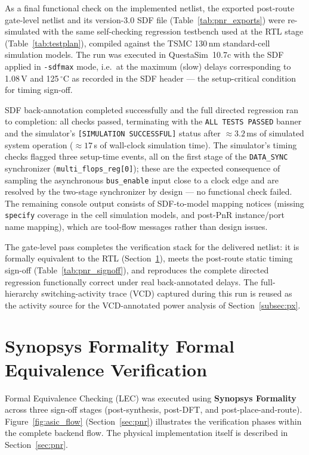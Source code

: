 \documentclass[11pt,a4paper]{article}
\begin{document}
As a final functional check on the implemented netlist, the exported post-route gate-level netlist and its version-3.0 SDF file (Table~\ref{tab:pnr_exports}) were re-simulated with the same self-checking regression testbench used at the RTL stage (Table~\ref{tab:testplan}), compiled against the TSMC 130\,nm standard-cell simulation models. The run was executed in QuestaSim~10.7c with the SDF applied in \texttt{-sdfmax} mode, i.e.\ at the maximum (slow) delays corresponding to 1.08\,V and 125\,$^\circ$C as recorded in the SDF header --- the setup-critical condition for timing sign-off.

SDF back-annotation completed successfully and the full directed regression ran to completion: all checks passed, terminating with the \texttt{ALL TESTS PASSED} banner and the simulator's \texttt{[SIMULATION SUCCESSFUL]} status after $\approx 3.2$\,ms of simulated system operation ($\approx 17$\,s of wall-clock simulation time). The simulator's timing checks flagged three setup-time events, all on the first stage of the \texttt{DATA\_SYNC} synchronizer (\texttt{multi\_flops\_reg[0]}); these are the expected consequence of sampling the asynchronous \texttt{bus\_enable} input close to a clock edge and are resolved by the two-stage synchronizer by design --- no functional check failed. The remaining console output consists of SDF-to-model mapping notices (missing \texttt{specify} coverage in the cell simulation models, and post-PnR instance/port name mapping), which are tool-flow messages rather than design issues.

The gate-level pass completes the verification stack for the delivered netlist: it is formally equivalent to the RTL (Section~\ref{sec:formality}), meets the post-route static timing sign-off (Table~\ref{tab:pnr_signoff}), and reproduces the complete directed regression functionally correct under real back-annotated delays. The full-hierarchy switching-activity trace (VCD) captured during this run is reused as the activity source for the VCD-annotated power analysis of Section~\ref{subsec:px}.
\section{Synopsys Formality Formal Equivalence Verification}
\label{sec:formality}

Formal Equivalence Checking (LEC) was executed using \textbf{Synopsys Formality}~\cite{synopsys_fm} across three sign-off stages (post-synthesis, post-DFT, and post-place-and-route). Figure~\ref{fig:asic_flow} (Section~\ref{sec:pnr}) illustrates the verification phases within the complete backend flow. The physical implementation itself is described in Section~\ref{sec:pnr}.
\end{document}
